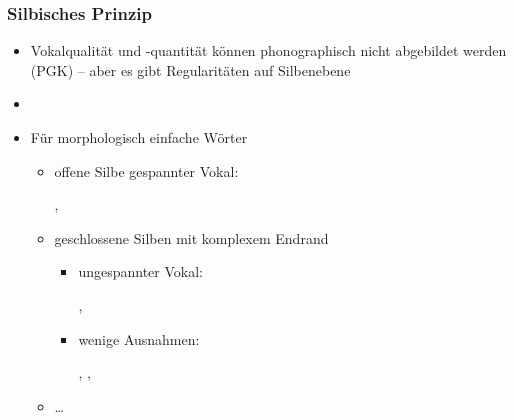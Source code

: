 \begin{frame}
\frametitle{Silbisches Prinzip}

\begin{itemize}
	\item Vokalqualität und -quantität können phonographisch nicht abgebildet werden (PGK) – aber es gibt Regularitäten auf Silbenebene
	\item[]
	\item Für morphologisch einfache Wörter 
	
	\begin{itemize}
		\item offene Silbe \ras gespannter Vokal: 
		
		  \ea
                  , 
                  \z
		
		\item geschlossene Silben mit komplexem Endrand
		
		\begin{itemize}
			\item \ras ungespannter Vokal: 
			
			  \ea
                          , 
                          \z
			
			\item wenige Ausnahmen: 
			
			  \ea
                          , , 
                          \z
			
		\end{itemize}
		\item \dots
	\end{itemize}
\end{itemize}


\end{frame}



